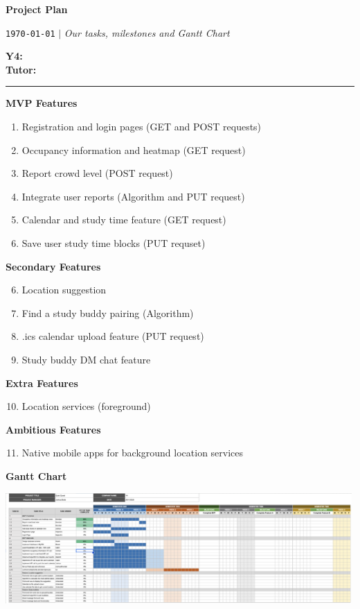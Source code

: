 \documentclass{article}
\begin{document}
\begin{Large}
    \textbf{Project Plan} \\
\end{Large}

\begin{large}
    \texttt{\today} $\vert$ \textit{Our tasks, milestones and Gantt Chart} \\
\end{large}



\textsf{\textbf{Y4:}} \\
\textsf{\textbf{Tutor:}} 


\vspace{1em}
\hrule
\vspace{1.5em}

\textbf{MVP Features}

\begin{enumerate}
    \item Registration and login pages (GET and POST requests)
    \item Occupancy information and heatmap (GET request)
    \item Report crowd level (POST request)
    \item Integrate user reports (Algorithm and PUT request)
    \item Calendar and study time feature (GET request)
    \item Save user study time blocks (PUT requset)
\end{enumerate}

\textbf{Secondary Features}

\begin{enumerate}
    \setcounter{enumi}{5}
    \item Location suggestion
    \item Find a study buddy pairing (Algorithm)
    \item .ics calendar upload feature (PUT request)
    \item Study buddy DM chat feature
\end{enumerate}

\textbf{Extra Features}
\begin{enumerate}
    \setcounter{enumi}{9}
    \item Location services (foreground)
\end{enumerate}

\textbf{Ambitious Features}
\begin{enumerate}
    \setcounter{enumi}{10}
    \item Native mobile apps for background location services
\end{enumerate}

\textbf{Gantt Chart}

    \begin{center}
        \includegraphics[width=500px]{gantt.png}
    \end{center}
\end{document}
